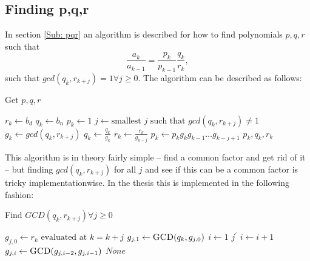 \subsection{Finding p,q,r}
In section \ref{Sub: pqr} an algorithm is described for how to find polynomials $p,q,r$ such that
\begin{equation}\label{Eq: getpqr}
  \frac{a_k}{a_{k-1}} = \frac{p_k}{p_{k-1}}\frac{q_k}{r_k},
\end{equation}
such that $gcd(q_k,r_{k+j})=1 \forall j\geq 0$. The algorithm can be described as follows:
\begin{algorithm}[H]
  \caption{Get $p,q,r$}
  \begin{algorithmic}[1]
      \State $r_k\gets b_d$
      \State $q_k\gets b_n$
      \State $p_k\gets 1$
        \State $j\gets \text{smallest } j \text{ such that } gcd(q_k,r_{k+j})\neq 1$
        \State $g_k\gets gcd(q_k,r_{k+j})$
        \State $q_k\gets \frac{q_k}{g_k}$
        \State $r_k\gets \frac{r_k}{g_{k-j}}$
        \State $p_k\gets p_kg_kg_{k-1}\ldots g_{k-j+1}$
      \EndWhile
      \State \Return $p_k,q_k,r_k$
    \EndProcedure
  \end{algorithmic}
\end{algorithm}
This algorithm is in theory fairly simple -- find a common factor and get rid of it -- but finding $gcd(q_k,r_{k+j})$ for all $j$ and see if this can be a common factor is tricky implementationwise. In the thesis this is implemented in the following fashion:
\begin{algorithm}[H]
  \caption{Find $GCD(q_k,r_{k+j})\forall j\geq 0$}
  \begin{algorithmic}[1]
      \State $g_{j,0}\gets r_k \text{ evaluated at } k=k+j$
      \State $g_{j,1}\gets \Call{GCD}{q_k,g_{j,0}}$
      \State $i\gets 1$
        \label{Alg: GCDWithShift,if}
          \State \Return $j^\prime$
        \EndIf
        \State $i\gets i+1$
        \State $g_{j,i}\gets \Call{GCD}{g_{j,i-2},g_{j,i-1}}$
      \EndWhile
      \State \Return $None$
    \EndProcedure
  \end{algorithmic}
\end{algorithm}
